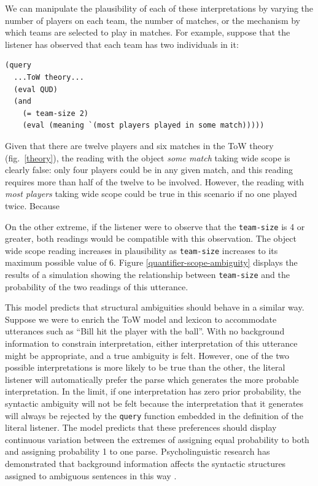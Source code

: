 \documentclass[12pt]{article}
\begin{document}
We can manipulate the plausibility of each of these interpretations by varying the number of players on each team, the number of matches, or the mechanism by which teams are selected to play in matches. 
For example, suppose that the listener has observed that each team has two individuals in it:
\begin{lstlisting}
(query
  ...ToW theory...
  (eval QUD)
  (and 
    (= team-size 2)
    (eval (meaning `(most players played in some match)))))
\end{lstlisting}
Given that there are twelve players and six matches in the ToW theory (fig.\ \ref{theory}), the reading with the object \emph{some match} taking wide scope is clearly false: only four players could be in any given match, and this reading requires more than half of the twelve to be involved. 
However, the reading with \emph{most players} taking wide scope could be true in this scenario if no one played twice. 
Because 

On the other extreme, if the listener were to observe that the \lstinline{team-size} is 4 or greater, both readings would be compatible with this observation. The object wide scope reading increases in plausibility as \lstinline{team-size} increases to its maximum possible value of 6. Figure \ref{quantifier-scope-ambiguity} displays the results of a simulation showing the relationship between \lstinline{team-size} and the probability of the two readings of this utterance.


This model predicts that structural ambiguities should behave in a similar way. Suppose we were to enrich the ToW model and lexicon to accommodate utterances such as ``Bill hit the player with the ball''. 
With no background information to constrain interpretation, either interpretation of this utterance might be appropriate, and a true ambiguity is felt. 
However, one of the two possible interpretations is more likely to be true than the other, the literal listener will automatically prefer the parse which generates the more probable interpretation.
In the limit, if one interpretation has zero prior probability, the syntactic ambiguity will not be felt because the interpretation that it generates will always be rejected by the \lstinline{query} function embedded in the definition of the literal listener.
The model predicts that these preferences should display continuous variation between the extremes of assigning equal probability to both and assigning probability 1 to one parse.
Psycholinguistic research has demonstrated that background information affects the syntactic structures assigned to ambiguous sentences in this way \citep{crainsteedman85,altmannsteedman88,spiveyetal02}.
\end{document}
